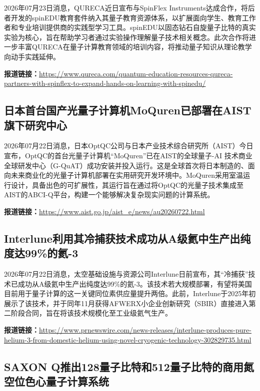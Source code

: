 \documentclass[12pt,a4paper]{ctexart}
\begin{document}
2026年07月23日消息，QURECA近日宣布与SpinFlex Instruments达成合作，将后者开发的spinEDU教育套件纳入其量子教育资源体系，以扩展面向学生、教育工作者和专业培训提供商的实践型学习工具。spinEDU以固态钻石自旋量子比特的真实实验为核心，旨在帮助学习者通过实验操作理解量子技术相关概念。此次合作将进一步丰富QURECA在量子计算教育领域的培训内容，将推动量子知识从理论教学向动手实践延伸。

\noindent\textbf{报道链接：}\url{https://www.qureca.com/quantum-education-resources-qureca-partners-with-spinflex-to-expand-hands-on-learning-with-spinedu/}

\subsection{ 日本首台国产光量子计算机MoQuren已部署在AIST旗下研究中心 }

2026年07月22日消息，日本OptQC公司与日本产业技术综合研究所（AIST）今日宣布，OptQC的首台光量子计算机“MoQuren”已在AIST的全球量子-AI 技术商业全球研发中心（G-QuAT）成功安装并投入运行。这是全球首次将日本制造的、面向未来商业化的光量子计算机部署在实用研究开发环境中。MoQuren采用室温运行设计，具备出色的可扩展性，其运行旨在通过将OptQC的光量子技术集成至AIST的ABCI-Q平台，构建一个能够解决复杂现实问题的计算系统。

\noindent\textbf{报道链接：}\url{https://www.aist.go.jp/aist\_e/news/au20260722.html}

\subsection{ Interlune利用其冷捕获技术成功从A级氦中生产出纯度达99\%的氦-3 }

2026年07月22日消息，太空基础设施与资源公司Interlune日前宣布，其“冷捕获”技术已成功从A级氦中生产出纯度达99\%的氦-3。该技术若大规模部署，有望将美国目前用于量子计算的这一关键同位素供应量提升两倍。此前，Interlune于2025年初展示了该技术，并于同年11月获得AFWERX小企业创新研究（SBIR）直接进入第二阶段合同，旨在将该技术规模化至工业级氦气生产。

\noindent\textbf{报道链接：}\url{https://www.prnewswire.com/news-releases/interlune-produces-pure-helium-3-from-domestic-helium-using-novel-cryogenic-technology-302829735.html}

\subsection{ SAXON Q推出128量子比特和512量子比特的商用氮空位色心量子计算系统 }
\end{document}
